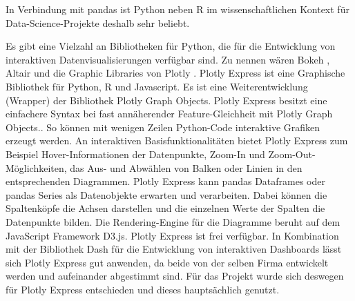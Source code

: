     In Verbindung mit pandas ist Python neben \textsf{R} im wissenschaftlichen Kontext für Data-Science-Projekte deshalb sehr beliebt.
    
    Es gibt eine Vielzahl an Bibliotheken für Python, die für die Entwicklung von interaktiven Datenvisualisierungen verfügbar sind. Zu
    nennen wären Bokeh \cite[vgl.][]{van_de_ven_bokeh_2021}, Altair \cite[vgl.][]{altair_altair_2021} und die 
    Graphic Libraries von Plotly \cite[vgl.][]{plotly_plotly_2021}.
    Plotly Express ist eine Graphische Bibliothek für Python, \textsf{R} und Javascript. Es ist eine Weiterentwicklung (Wrapper) der Bibliothek Plotly Graph Objects. 
    Plotly Express besitzt eine einfachere Syntax bei fast annäherender Feature-Gleichheit mit Plotly Graph Objects.\cite[][]{plotly_plotly_2021}.
    So können mit wenigen Zeilen Python-Code interaktive Grafiken erzeugt werden. 
    An interaktiven Basisfunktionalitäten bietet Plotly Express zum Beispiel Hover-Informationen der Datenpunkte, Zoom-In und Zoom-Out-Möglichkeiten,
    das Aus- und Abwählen von Balken oder Linien in den entsprechenden Diagrammen. Plotly Express kann pandas Dataframes 
    oder pandas Series als Datenobjekte erwarten und verarbeiten. Dabei können die Spaltenköpfe die Achsen darstellen 
    und die einzelnen Werte der Spalten die Datenpunkte bilden. Die Rendering-Engine für die Diagramme beruht auf dem JavaScript Framework D3.js. 
    Plotly Express ist frei verfügbar. In Kombination mit der Bibliothek Dash für die Entwicklung von interaktiven Dashboards lässt sich Plotly Express gut anwenden, 
    da beide von der selben Firma entwickelt werden und aufeinander abgestimmt sind.  Für das Projekt wurde sich deswegen für Plotly Express entschieden 
    und dieses hauptsächlich genutzt. 
    
